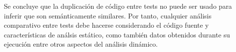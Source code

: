 \par Se concluye que la duplicación de código entre tests no puede ser usado para inferir que son semánticamente similares. Por tanto, cualquier análisis comparativo entre tests debe hacerse considerando el código fuente y características de análsis estático, como también datos obtenidos durante su ejecución entre otros aspectos del análisis dinámico. 








